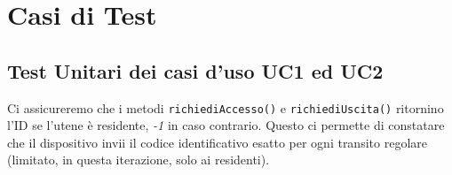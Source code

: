 \documentclass[12pt, letterpaper]{article}
\begin{document}
\section{Casi di Test}

\subsection{Test Unitari dei casi d'uso UC1 ed UC2}
Ci assicureremo che i metodi \texttt{richiediAccesso()} e 
\texttt{richiediUscita()} ritornino l'ID se l'utene è 
residente, \emph{-1} in caso contrario. 
Questo ci permette di constatare che il dispositivo 
invii il codice identificativo esatto per ogni 
transito regolare (limitato, in questa iterazione,
solo ai residenti).
\end{document}
